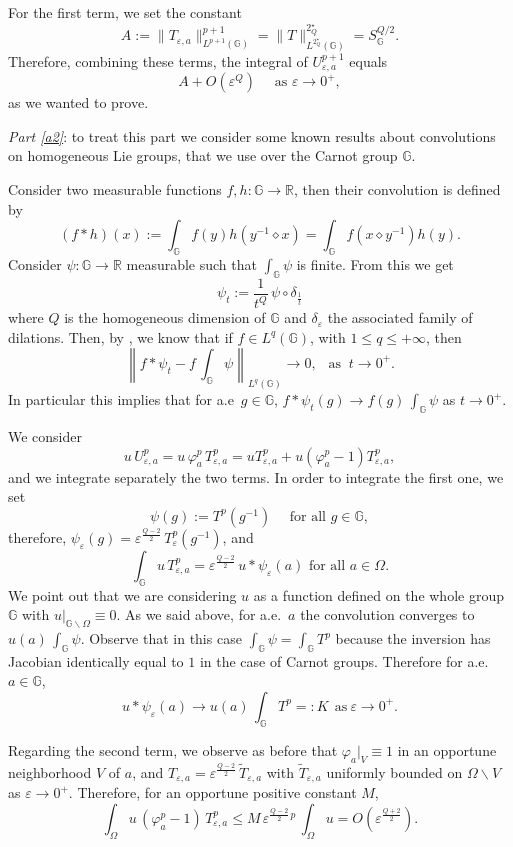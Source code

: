 \documentclass[11pt]{amsart}
\numberwithin{equation}{section} %
\theoremstyle{definition}
\def\R{\mathbb{R}}
\def\G{\mathbb{G}}
\newcommand{\m}{\mbox}
\newcommand{\cor}{\textit}
\begin{document}
For the first term, we set the constant
\[
A:=\|T_{\varepsilon,a}\|_{L^{p+1}(\G)}^{p+1}=\|T\|_{L^{2^\star_Q}(\G)}^{2^\star_Q}=S_\G^{Q\slash 2}.
\]
Therefore, combining
these terms, the integral of $U_{\varepsilon,a}^{p+1}$ equals
\[
A+O(\varepsilon^{Q}) \quad \textrm{ as } \varepsilon \to 0^{+},
\]
as we wanted to prove.

\cor{Part \eqref{a2}}:
to treat this part we consider 
some known results about convolutions 
on homogeneous Lie groups, that we use over the
Carnot group $\G$.

Consider two measurable functions $f,h\colon \G\to \R$,
then their convolution is defined by
    \[
   	(f\ast h)(x):=\int_\G f(y)h(y^{-1}\diamond x)
   	=\int_\G f(x\diamond y^{-1})h(y).
    \]
Consider $\psi\colon \G\to \R$ measurable
such that $\int_\G\psi$ is finite. 
From this we get
\[
\psi_t:=\frac{1}{t^Q}\, \psi\circ\delta_{\frac{1}{t}}
\]
where $Q$ is the homogeneous dimension of $\G$ and
$\delta_{\varepsilon}$ the associated family of dilations.
Then,
by \cite[Proposition 1.20]{FollandStein},
we know that if $f\in L^q(\G)$, with $1\leq q\leq+\infty$, then
\[
\left\|f\ast\psi_t-f\, \int_\G\psi\right\|_{L^q(\G)}\to 0,\ \ \m{ as }\ t\to0^+.
\]
In particular this implies that
for a.e~$g\in\G$, $f\ast\psi_t(g)\to f(g)\, \int_\G\psi$ as $t\to0^+$.\newline

We consider 
\[
u\, U_{\varepsilon,a}^p=u\, \varphi_a^p\, T_{\varepsilon,a}^p=u T_{\varepsilon,a}^p+u(\varphi_a^p-1)T_{\varepsilon,a}^p,
\]
and we integrate separately the two terms.
In order to integrate the first one, we set
\[
\psi(g):=T^p(g^{-1})\quad \textrm{ for all } g\in\G,
\]
therefore, $\psi_\varepsilon(g)=\varepsilon^{\frac{Q-2}{2}}\, T^p_{\varepsilon}(g^{-1})$, and
\[
\int_\G u\, T_{\varepsilon,a}^p=\varepsilon^{\frac{Q-2}{2}}\, u\ast \psi_\varepsilon(a)\textrm{ for all } a\in \Omega.
\]
We point out that we are considering $u$ as a function defined
on the whole group $\G$ with $u|_{\G\backslash \Omega}\equiv0$.
As we said above, for a.e.~$a$ the convolution converges to $u(a)\, \int_\G \psi$.
Observe that in this case $\int_\G\psi=\int_\G T^p$ because the inversion
has Jacobian identically equal to $1$ in the case of Carnot groups. Therefore
for a.e.~$a\in\G$,
\[
u\ast \psi_\varepsilon(a)\to u(a)\, \int_\G T^p=:K\ \ \m{as}\ \varepsilon\to0^+.
\]

Regarding the second term, we observe as before that $\varphi_a|_V\equiv1$
in an opportune neighborhood $V$ of $a$, and 
$T_{\varepsilon,a}=\varepsilon^{\frac{Q-2}{2}}\, \widetilde T_{\varepsilon,a}$ with
$\widetilde T_{\varepsilon,a}$ uniformly bounded on $\Omega\backslash V$ as $\varepsilon\to0^+$.
Therefore, for an opportune positive constant $M$,
\[
\int_\Omega u\, (\varphi_a^p-1)\, T_{\varepsilon,a}^p\leq M\, \varepsilon^{\frac{Q-2}{2}\, p}\, \int_\Omega u=O\left(\varepsilon^{\frac{Q+2}{2}}\right).
\]
\end{document}
